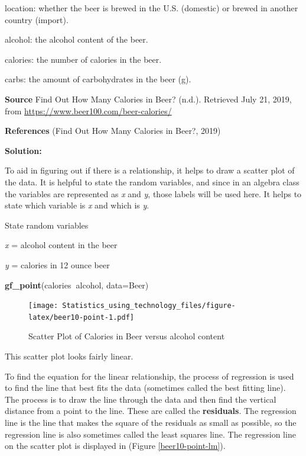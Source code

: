 \documentclass[]{book}
\newenvironment{Shaded}{\begin{snugshade}}{\end{snugshade}}
\newcommand{\DataTypeTok}[1]{\textcolor[rgb]{0.13,0.29,0.53}{#1}}
\newcommand{\KeywordTok}[1]{\textcolor[rgb]{0.13,0.29,0.53}{\textbf{#1}}}
\newcommand{\NormalTok}[1]{#1}
\newcommand{\OperatorTok}[1]{\textcolor[rgb]{0.81,0.36,0.00}{\textbf{#1}}}
\begin{document}
location: whether the beer is brewed in the U.S. (domestic) or brewed in another country (import).

alcohol: the alcohol content of the beer.

calories: the number of calories in the beer.

carbs: the amount of carbohydrates in the beer (g).

\textbf{Source}
Find Out How Many Calories in Beer? (n.d.). Retrieved July 21, 2019, from \url{https://www.beer100.com/beer-calories/}

\textbf{References}
(Find Out How Many Calories in Beer?, 2019)

\textbf{Solution:}

To aid in figuring out if there is a relationship, it helps to draw a scatter plot of the data. It is helpful to state the random variables, and since in an algebra class the variables are represented as \emph{x} and \emph{y}, those labels will be used here. It helps to state which variable is \emph{x} and which is \emph{y}.

State random variables

\emph{x} = alcohol content in the beer

\emph{y} = calories in 12 ounce beer



\begin{Shaded}
\begin{Highlighting}[]
\KeywordTok{gf_point}\NormalTok{(calories}\OperatorTok{~}\NormalTok{alcohol, }\DataTypeTok{data=}\NormalTok{Beer)}
\end{Highlighting}
\end{Shaded}

\begin{figure}
\centering
\texttt{[image: Statistics\_using\_technology\_files/figure-latex/beer10-point-1.pdf]}
\caption{\label{fig:beer10-point}Scatter Plot of Calories in Beer versus alcohol content}
\end{figure}

This scatter plot looks fairly linear.

To find the equation for the linear relationship, the process of regression is used to find the line that best fits the data (sometimes called the best fitting line). The process is to draw the line through the data and then find the vertical distance from a point to the line. These are called the \textbf{residuals}. The regression line is the line that makes the square of the residuals as small as possible, so the regression line is also sometimes called the least squares line. The regression line on the scatter plot is displayed in (Figure \ref{beer10-point-lm}).
\end{document}
